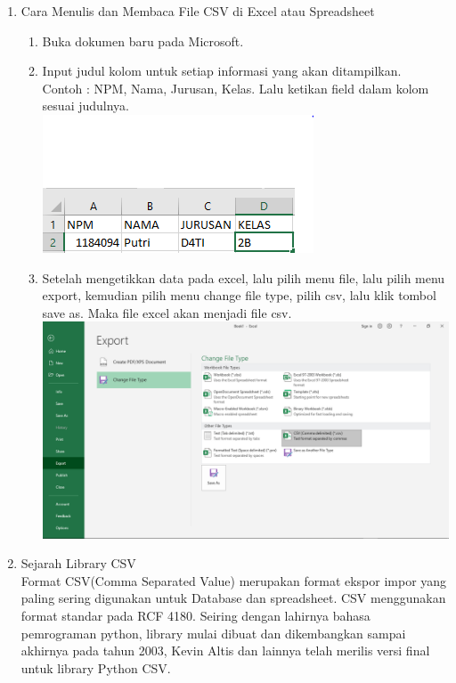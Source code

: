 \begin{enumerate}
\item  Cara Menulis dan Membaca File CSV di Excel atau Spreadsheet\\
\begin{enumerate}
\item Buka dokumen baru pada Microsoft.
\item Input judul kolom untuk setiap informasi yang akan ditampilkan.\\
Contoh : NPM, Nama, Jurusan, Kelas. Lalu ketikan field dalam kolom sesuai judulnya.\\
\includegraphics{gambar/csv1.png}
\item Setelah mengetikkan data pada excel, lalu pilih menu file, lalu pilih menu export, kemudian pilih menu change file type, pilih csv, lalu klik tombol save as. Maka file excel akan menjadi file csv.\\
\includegraphics[scale = 0.3]{gambar/csv2.png}
\end{enumerate}

\item Sejarah Library CSV\\
Format CSV(Comma Separated Value) merupakan format ekspor impor yang paling sering digunakan untuk Database dan spreadsheet. CSV menggunakan format standar pada RCF 4180.  Seiring dengan lahirnya bahasa pemrograman python, library mulai dibuat dan dikembangkan sampai akhirnya pada tahun 2003, Kevin Altis dan lainnya telah merilis versi final untuk library Python CSV.


\end{enumerate}
